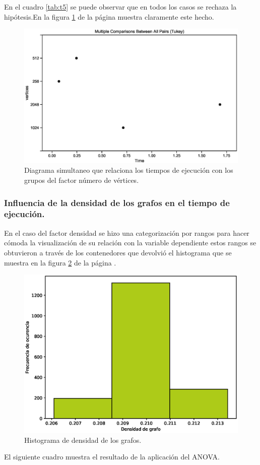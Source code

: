 \documentclass{article}
\begin{document}
En el cuadro \ref{tab:t5} se puede observar que en todos los casos se rechaza la hipótesis.En la figura \ref{fig7} de la página \pageref{fig7} muestra claramente este hecho.
\begin{center}
\begin{figure}[htbp]
\includegraphics[scale=0.6,width=\textwidth, trim=0 0 0 20, clip=true]{simultaneoustukeyvertices.eps}
\caption{Diagrama simultaneo que relaciona los tiempos de ejecución con los grupos del factor número de vértices.}
\label{fig7}
\end{figure}
\end{center}
\subsubsection{Influencia de la densidad de los grafos en el tiempo de ejecución.}

En el caso del factor densidad se hizo una categorización por rangos para hacer cómoda la visualización de su relación con la variable dependiente estos rangos se obtuvieron a través de los contenedores que devolvió el histograma que se muestra en la figura \ref{fig3} de la página \pageref{fig3}.

\begin{center}
\begin{figure}[ht]
\includegraphics[scale=0.5]{boxplot.eps}
\caption{Histograma de densidad de los grafos.}
\label{fig3}
\end{figure}
\end{center}
El siguiente cuadro muestra el resultado de la aplicación del ANOVA.
\end{document}
